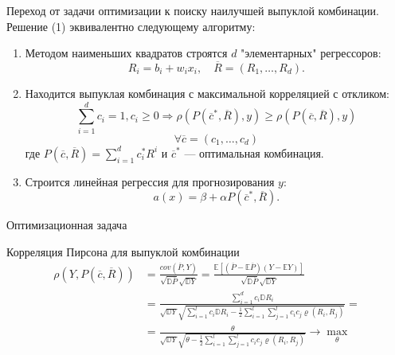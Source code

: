 \documentclass{beamer}
\begin{document}
\begin{frame}{Переход от задачи оптимизации к поиску наилучшей выпуклой комбинации.}
Решение (1) эквивалентно следующему алгоритму:
\begin{enumerate}
    \item Методом наименьших квадратов строятся $d$ "элементарных" регрессоров:
    $$
    R_i = b_i + w_ix_i, \quad \overline{R} = (R_1, \dots, R_d).
    $$
    \item Находится выпуклая комбинация с максимальной корреляцией с откликом:
    $$
     \sum_{i=1}^d c_i = 1, c_i \geq 0 \Rightarrow \rho(P(\overline{c}^*, \overline{R}), y) \geq \rho(P(\overline{c}, \overline{R}), y) 
    $$
    $$
    \forall \overline{c} = (c_1, \dots, c_d)
    $$
    где $P(\overline{c},\overline{R}) = \sum_{i=1}^d c_i^* R^i$ и $\overline{c}^*$ — оптимальная комбинация.
    \item Строится линейная регрессия для прогнозирования $y$:
    $$
    a(x) = \beta + \alpha P(\overline{c}^*, \overline{R}).
    $$
\end{enumerate}
\end{frame}
\begin{frame}{Оптимизационная задача}
\begin{block}{Корреляция Пирсона для выпуклой комбинации}
\begin{align*}
    \rho(Y, P(\overline{c}, \overline{R})) &= \frac{cov(\overline{P}, Y)}{\sqrt{\mathbb{D}\overline{P}} \sqrt{\mathbb{D}Y}} = \frac{\mathbb{E}[(\overline{P} - \mathbb{E}\overline{P})(Y - \mathbb{E}Y)]}{\sqrt{\mathbb{D}\overline{P}} \sqrt{\mathbb{D}Y}}\\ 
    &= \frac{\sum_{i=1}^d c_i \mathbb{D}R_i}{\sqrt{\mathbb{D}Y} \sqrt{ \sum_{i=1}^l c_i \mathbb{D}R_i - \frac{1}{2} \sum_{i=1}^l \sum_{j=1}^l c_i c_j \varrho(R_i, R_j)}} = \\
    &= \frac{\theta}{\sqrt{\mathbb{D}Y} \sqrt{ \theta- \frac{1}{2} \sum_{i=1}^l \sum_{j=1}^l c_i c_j \varrho(R_i, R_j)}} \rightarrow \max_{\theta}
\end{align*}
\end{block}
\end{frame}
\end{document}
